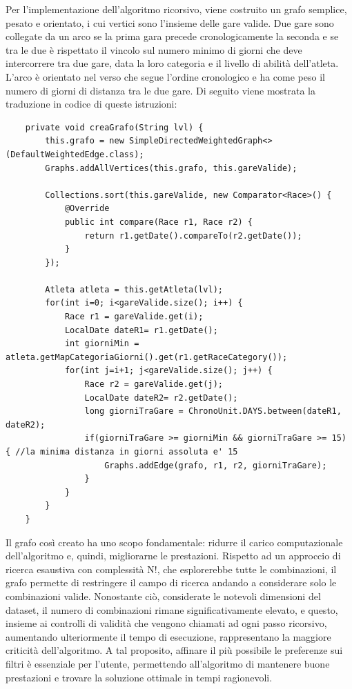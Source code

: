 \documentclass[a4paper, 12pt, oneside]{book}
\begin{document}
Per l'implementazione dell'algoritmo ricorsivo, viene costruito un grafo semplice, pesato e orientato, i cui vertici sono l'insieme delle gare valide. Due gare sono collegate da un arco se la prima gara precede cronologicamente la seconda e se tra le due è rispettato il vincolo sul numero minimo di giorni che deve intercorrere tra due gare, data la loro categoria e il livello di abilità dell'atleta. L'arco è orientato nel verso che segue l'ordine cronologico e ha come peso il numero di giorni di distanza tra le due gare. Di seguito viene mostrata la traduzione in codice di queste istruzioni: 
\begin{lstlisting}
    private void creaGrafo(String lvl) {
		this.grafo = new SimpleDirectedWeightedGraph<>(DefaultWeightedEdge.class);
		Graphs.addAllVertices(this.grafo, this.gareValide);
		
		Collections.sort(this.gareValide, new Comparator<Race>() {
			@Override
			public int compare(Race r1, Race r2) {
				return r1.getDate().compareTo(r2.getDate());
			}	
		});
		
		Atleta atleta = this.getAtleta(lvl);
		for(int i=0; i<gareValide.size(); i++) {
			Race r1 = gareValide.get(i);
			LocalDate dateR1= r1.getDate();
			int giorniMin = atleta.getMapCategoriaGiorni().get(r1.getRaceCategory());
			for(int j=i+1; j<gareValide.size(); j++) {
				Race r2 = gareValide.get(j);
				LocalDate dateR2= r2.getDate();
				long giorniTraGare = ChronoUnit.DAYS.between(dateR1, dateR2);
				if(giorniTraGare >= giorniMin && giorniTraGare >= 15) { //la minima distanza in giorni assoluta e' 15
					Graphs.addEdge(grafo, r1, r2, giorniTraGare);
				}
			}
		}
	}
\end{lstlisting}
Il grafo così creato ha uno scopo fondamentale: ridurre il carico computazionale dell'algoritmo e, quindi, migliorarne le prestazioni. Rispetto ad un approccio di ricerca esaustiva con complessità N!, che esplorerebbe tutte le combinazioni, il grafo permette di restringere il campo di ricerca andando a considerare solo le combinazioni valide. Nonostante ciò, considerate le notevoli dimensioni del dataset, il numero di combinazioni rimane significativamente elevato, e questo, insieme ai controlli di validità che vengono chiamati ad ogni passo ricorsivo, aumentando ulteriormente il tempo di esecuzione, rappresentano la maggiore criticità dell'algoritmo. A tal proposito, affinare il più possibile le preferenze sui filtri è essenziale per l'utente, permettendo all'algoritmo di mantenere buone prestazioni e trovare la soluzione ottimale in tempi ragionevoli. 
\end{document}
